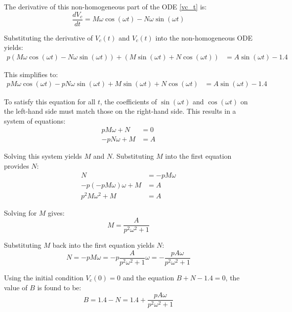 The derivative of this non-homogeneous part of the ODE \eqref{vc_t} is:
\begin{equation}
\frac{dV_c}{dt} = M\omega\cos(\omega t) - N\omega\sin(\omega t)
\end{equation}

Substituting the derivative of $V_c(t)$ and $V_c(t)$ into the non-homogeneous ODE yields:
\begin{align}
p(M\omega\cos(\omega t) - N\omega\sin(\omega t)) + (M\sin(\omega t) + N\cos(\omega t)) &= A\sin(\omega t) - 1.4
\end{align}

This simplifies to:
\begin{align}
pM\omega\cos(\omega t) - pN\omega\sin(\omega t) + M\sin(\omega t) + N\cos(\omega t) &= A\sin(\omega t) - 1.4
\end{align}

To satisfy this equation for all $t$, the coefficients of $\sin(\omega t)$ and $\cos(\omega t)$ on the left-hand side must match those on the right-hand side. This results in a system of equations:
\begin{align}
pM\omega + N &= 0\\
-pN\omega + M &= A
\end{align}

Solving this system yields $M$ and $N$. Substituting $M$ into the first equation provides $N$:
\begin{align}
N &= -pM\omega\\
-p(-pM\omega)\omega + M &= A\\
p^2M\omega^2 + M &= A
\end{align}

Solving for $M$ gives:
\begin{equation}
M = \frac{A}{p^2\omega^2 + 1}
\end{equation}

Substituting $M$ back into the first equation yields $N$:
\begin{equation}
N = -pM\omega = -p\frac{A}{p^2\omega^2 + 1}\omega = -\frac{pA\omega}{p^2\omega^2 + 1}
\end{equation}

Using the initial condition $V_c(0) = 0$ and the equation $B + N - 1.4 = 0$, the value of $B$ is found to be:
\begin{equation}
B = 1.4 - N = 1.4 + \frac{pA\omega}{p^2\omega^2 + 1}
\end{equation}

